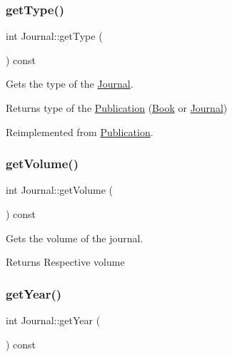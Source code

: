 \mbox{\label{class_journal_ad787716ffbd1d22623245cf98c13ac4a}} 
\subsubsection{\texorpdfstring{get\+Type()}{getType()}}
{\footnotesize\ttfamily int Journal\+::get\+Type (\begin{DoxyParamCaption}{ }\end{DoxyParamCaption}) const\hspace{0.3cm}{\ttfamily [virtual]}}



Gets the type of the \hyperlink{class_journal}{Journal}. 

\begin{DoxyReturn}{Returns}
type of the \hyperlink{class_publication}{Publication} (\hyperlink{class_book}{Book} or \hyperlink{class_journal}{Journal}) 
\end{DoxyReturn}


Reimplemented from \hyperlink{class_publication_ab0bd9119b29b09fbbe9044016a512407}{Publication}.

\mbox{\label{class_journal_af853578ebebf1297419889c2f1b5cfc9}} 
\subsubsection{\texorpdfstring{get\+Volume()}{getVolume()}}
{\footnotesize\ttfamily int Journal\+::get\+Volume (\begin{DoxyParamCaption}{ }\end{DoxyParamCaption}) const}



Gets the volume of the journal. 

\begin{DoxyReturn}{Returns}
Respective volume 
\end{DoxyReturn}
\mbox{\label{class_journal_a9db201ef096712da288a3f3df0d86125}} 
\subsubsection{\texorpdfstring{get\+Year()}{getYear()}}
{\footnotesize\ttfamily int Journal\+::get\+Year (\begin{DoxyParamCaption}{ }\end{DoxyParamCaption}) const}



